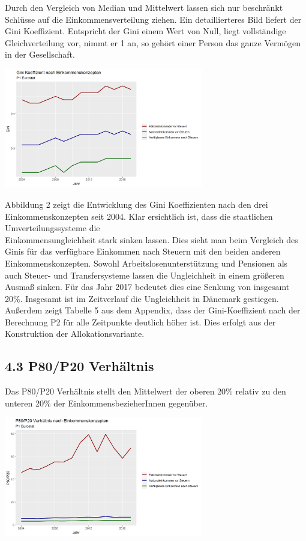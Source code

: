 \documentclass[ngerman,]{article}
\let\origfigure\figure
\let\endorigfigure\endfigure
\renewenvironment{figure}[1][2] {
        \expandafter\origfigure\expandafter[H]
      } {\endorigfigure}
\begin{document}
Durch den Vergleich von Median und Mittelwert lassen sich nur beschränkt
Schlüsse auf die Einkommensverteilung ziehen. Ein detaillierteres Bild
liefert der Gini Koeffizient. Entspricht der Gini einem Wert von Null,
liegt vollständige Gleichverteilung vor, nimmt er 1 an, so gehört einer
Person das ganze Vermögen in der Gesellschaft.

\begin{figure}
\centering
\includegraphics[width=0.65000\textwidth]{img/gini.png}
\caption{Gini-Index, 2004-2017}
\end{figure}

Abbildung 2 zeigt die Entwicklung des Gini Koeffizienten nach den drei
Einkommenskonzepten seit 2004. Klar ersichtlich ist, dass die
staatlichen Umverteilungssysteme die\\
Einkommensungleichheit stark sinken lassen. Dies sieht man beim
Vergleich des Ginis für das verfügbare Einkommen nach Steuern mit den
beiden anderen Einkommenskonzepten. Sowohl Arbeitslosenunterstützung und
Pensionen als auch Steuer- und Transfersysteme lassen die Ungleichheit
in einem größeren Ausmaß sinken. Für das Jahr 2017 bedeutet dies eine
Senkung von insgesamt 20\%. Insgesamt ist im Zeitverlauf die
Ungleichheit in Dänemark gestiegen. Außerdem zeigt Tabelle 5 aus dem
Appendix, dass der Gini-Koeffizient nach der Berechnung P2 für alle
Zeitpunkte deutlich höher ist. Dies erfolgt aus der Konstruktion der
Allokationsvariante.

\subsection{4.3 P80/P20 Verhältnis}\label{p80p20-verhaltnis}

Das P80/P20 Verhältnis stellt den Mittelwert der oberen 20\% relativ zu
den unteren 20\% der EinkommensbezieherInnen gegenüber.

\begin{figure}
\centering
\includegraphics[width=0.65000\textwidth]{img/8020.png}
\caption{P80/P20 Verhältnis, 2004-2017}
\end{figure}
\end{document}

